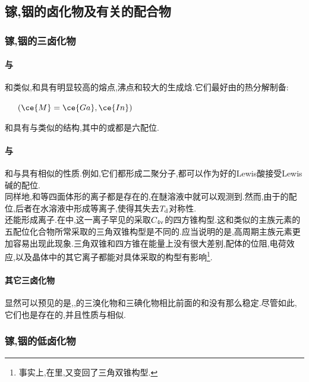 \documentclass{ctexart}
\begin{document}
\subsection{镓,铟的卤化物及有关的配合物}
\subsubsection{镓,铟的三卤化物}
\paragraph{与}
和类似,和具有明显较高的熔点,沸点和较大的生成焓.它们最好由的热分解制备:
\begin{center}
    \ \ \ $\left(\ce{M}=\ce{Ga},\ce{In}\right)$
\end{center}
和具有与类似的结构,其中的或都是六配位.
\paragraph{与}
和与具有相似的性质.例如,它们都形成二聚分子,都可以作为好的Lewis酸接受Lewis碱的配位.\\
\indent 同样地,\ce{[GaX4]-}和\ce{[InCl4]-}等四面体形的离子都是存在的,在醚溶液中就可以观测到.然而,由于的配位,后者在水溶液中形成\ce{[InCl4(H2O)2]-}等离子,使得其失去$T_{\text d}$对称性.\\
\indent {}还能形成离子.在中,这一离子罕见的采取$C_{4\text v}$的四方锥构型.这和类似的主族元素的五配位化合物所常采取的三角双锥构型是不同的.应当说明的是,高周期主族元素更加容易出现此现象.三角双锥和四方锥在能量上没有很大差别,配体的位阻,电荷效应,以及晶体中的其它离子都能对具体采取的构型有影响\footnote{事实上,在里,又变回了三角双锥构型.}.
\paragraph{其它三卤化物}
显然可以预见的是,,的三溴化物和三碘化物相比前面的和没有那么稳定.尽管如此,它们也是存在的,并且性质与相似.
\subsubsection{镓,铟的低卤化物}
\end{document}
